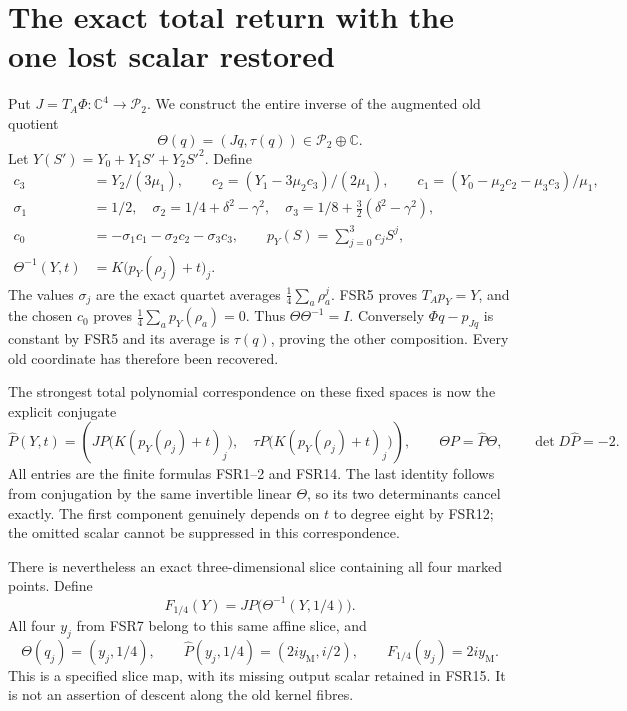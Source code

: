\documentclass[11pt]{article}
\newcommand{\C}{\mathbb C}
\begin{document}
\section{The exact total return with the one lost scalar restored}
Put $J=T_A\Phi:\C^4\to\mathcal P_2$. We construct the entire
inverse of the augmented old quotient
\[
 \Theta(q)=(Jq,\tau(q))\in\mathcal P_2\oplus\C.
 \tag{FSR13}
\]
Let $Y(S')=Y_0+Y_1S'+Y_2S'^2$. Define
\[
\begin{split}
 c_3&=Y_2/(3\mu_1),\qquad
 c_2=(Y_1-3\mu_2c_3)/(2\mu_1),\qquad
 c_1=(Y_0-\mu_2c_2-\mu_3c_3)/\mu_1,\\
 \sigma_1&=1/2,\quad
 \sigma_2=1/4+\delta^2-\gamma^2,\quad
 \sigma_3=1/8+\tfrac32(\delta^2-\gamma^2),\\
 c_0&=-\sigma_1c_1-\sigma_2c_2-\sigma_3c_3,
 \qquad p_Y(S)=\sum_{j=0}^3c_jS^j,\\
 \Theta^{-1}(Y,t)&=K\bigl(p_Y(\rho_j)+t\bigr)_j.
\end{split}\tag{FSR14}
\]
The values $\sigma_j$ are the exact quartet averages
$\tfrac14\sum_a\rho_a^j$. FSR5 proves $T_Ap_Y=Y$, and the
chosen $c_0$ proves $\tfrac14\sum_ap_Y(\rho_a)=0$.
Thus $\Theta\Theta^{-1}=I$. Conversely $\Phi q-p_{Jq}$ is
constant by FSR5 and its average is $\tau(q)$, proving the other
composition. Every old coordinate has therefore been recovered.

The strongest total polynomial correspondence on these fixed spaces
is now the explicit conjugate
\[
 \widehat P(Y,t)=
 \left(JP\bigl(K(p_Y(\rho_j)+t)_j\bigr),\quad
       \tau P\bigl(K(p_Y(\rho_j)+t)_j\bigr)\right),
 \qquad \Theta P=\widehat P\Theta,
 \qquad\det D\widehat P=-2.
 \tag{FSR15}
\]
All entries are the finite formulas FSR1--2 and FSR14. The last
identity follows from conjugation by the same invertible linear
$\Theta$, so its two determinants cancel exactly. The first
component genuinely depends on $t$ to degree eight by FSR12;
the omitted scalar cannot be suppressed in this correspondence.

There is nevertheless an exact three-dimensional slice containing
all four marked points. Define
\[
 F_{1/4}(Y)=JP\bigl(\Theta^{-1}(Y,1/4)\bigr).
 \tag{FSR16}
\]
All four $y_j$ from FSR7 belong to this same affine slice, and
\[
 \Theta(q_j)=(y_j,1/4),\qquad
 \widehat P(y_j,1/4)=(2iy_{\mathrm M},i/2),\qquad
 F_{1/4}(y_j)=2iy_{\mathrm M}.
 \tag{FSR17}
\]
This is a specified slice map, with its missing output scalar
retained in FSR15. It is not an assertion of descent along the
old kernel fibres.
\end{document}
